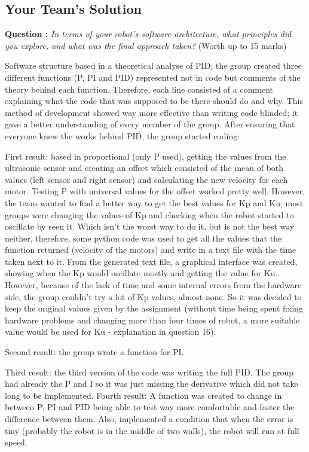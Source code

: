 \documentclass[hidelinks,a4paper,11pt]{article}
\newcounter{question}
\newcommand\myq{\refstepcounter{question}\thequestion}
\begin{document}
	
	\subsection{Your Team's Solution}
	
	{\bfseries Question \myq:}  \emph{In terms of your robot's software architecture, what principles did you explore, and what was the final approach taken?} (Worth up to 15 marks)\\
	\begin{mdframed}
	Software structure based in a theoretical analyse of PID; the group created three different functions (P, PI and PID) represented not in code but comments of the theory behind each function. Therefore, each line consisted of a comment explaining what the code that was supposed to be there should do and why.
This method of development showed way more effective than writing code blinded; it gave a better understanding of every member of the group. After ensuring that everyone knew the works behind PID, the group started coding:

First result: based in proportional (only P used), getting the values from the ultrasonic sensor and creating an offset which consisted of the mean of both values (left sensor and right sensor) and calculating the new velocity for each motor. Testing P with universal values for the offset worked pretty well. However, the team wanted to find a better way to get the best values for Kp and Ku; most groups were changing the values of Kp and checking when the robot started to oscillate by seen it. Which isn't the worst way to do it, but is not the best way neither, therefore, some python code was used to get all the values that the function returned (velocity of the motors) and write in a text file with the time taken next to it. From the generated text file, a graphical interface was created, showing when the Kp would oscillate mostly and getting the value for Ku. 
However, because of the lack of time and some internal errors from the hardware side, the group couldn't try a lot of Kp values, almost none. So it was decided to keep the original values given by the assignment (without time being spent fixing hardware problems and changing more than four times of robot, a more suitable value would be used for Ku - explanation in question 16).

Second result: the group wrote a function for PI.

Third result: the third version of the code was writing the full PID. The group had already the P and I so it was just missing the derivative which did not take long to be implemented.
Fourth result: A function was created to change in between P, PI and PID being able to test way more comfortable and faster the difference between them. Also, implemented a condition that when the error is tiny (probably the robot is in the middle of two walls), the robot will run at full speed.


\end{mdframed}
\end{document}
